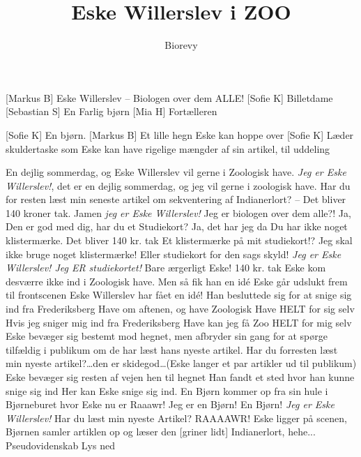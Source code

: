 \documentclass[a4paper,12pt]{article}
\title{Eske Willerslev i ZOO}
\author{Biorevy}
\begin{document}
\maketitle

\begin{texxers}
\end{texxers}

\begin{roles}
	[Markus B] Eske Willerslev -- Biologen over dem ALLE!
	[Sofie K] Billetdame
	[Sebastian S] En Farlig bjørn
	[Mia H] Fortælleren
\end{roles}


\begin{props}
	[Sofie K] En bjørn.
	[Markus B] Et lille hegn Eske kan hoppe over
	[Sofie K] Læder skuldertaske som Eske kan have rigelige mængder af sin artikel, til uddeling
\end{props}

\begin{sketch}


 En dejlig sommerdag, og Eske Willerslev vil gerne i Zoologisk have.
 \emph{Jeg er Eske Willerslev!}, det er en dejlig sommerdag, og jeg vil gerne i zoologisk have. Har du for resten læst min seneste artikel om sekventering af Indianerlort? -- 
  Det bliver 140 kroner tak.
 Jamen \emph{jeg er Eske Willerslev!} Jeg er biologen over dem alle?!
 Ja, Den er god med dig, har du et Studiekort?
 Ja, det har jeg da 
 Du har ikke noget klistermærke. Det bliver 140 kr. tak
 Et klistermærke på mit studiekort!? Jeg skal ikke bruge noget klistermærke! Eller studiekort for den sags skyld! \emph{Jeg er Eske Willerslev! Jeg ER studiekortet!}
 Bare ærgerligt Eske! 140 kr. tak
 Eske kom desværre ikke ind i Zoologisk have. Men så fik han en idé
\scene Eske går udslukt frem til frontscenen
 Eske Willerslev har fået en idé!
 Han besluttede sig for at snige sig ind fra Frederiksberg Have om aftenen, og have Zoologisk Have HELT for sig selv
 Hvis jeg sniger mig ind fra Frederiksberg Have kan jeg få Zoo HELT for mig selv
\scene Eske bevæger sig bestemt mod hegnet, men afbryder sin gang for at spørge tilfældig i publikum om de har læst hans nyeste artikel.
 Har du forresten læst min nyeste artikel?\ldots den er skidegod\ldots (Eske langer et par artikler ud til publikum)
\scene Eske bevæger sig resten af vejen hen til hegnet
 Han fandt et sted hvor han kunne snige sig ind
 Her kan Eske snige sig ind. 
\scene En Bjørn kommer op fra sin hule i Bjørneburet hvor Eske nu er
 Raaawr! Jeg er en Bjørn!
 En Bjørn! \emph{Jeg er Eske Willerslev!} Har du læst min nyeste Artikel?
 RAAAAWR! 
\scene Eske ligger på scenen, Bjørnen samler artiklen op og læser den
[griner lidt] Indianerlort, hehe... Pseudovidenskab
\scene Lys ned



\end{sketch}
\end{document}
